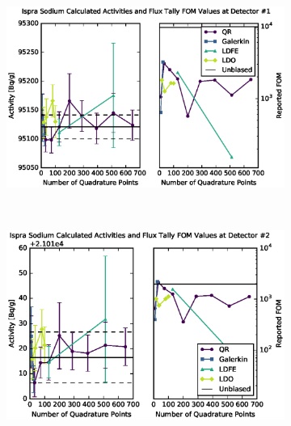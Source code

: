 \begin{figure}[!htb]
\begin{subfigure}{\linewidth}
\centering
\includegraphics[max height=0.445\textheight]
{img/eurac-plots/mcnp/fwc-14.eps}
\label{eurac-14}
\end{subfigure} 
\\
\begin{subfigure}{\linewidth}
\centering
\includegraphics[max height=0.445\textheight]
{img/eurac-plots/mcnp/fwc-24.eps}
\label{eurac-24}
\end{subfigure}
\end{figure}
\clearpage
